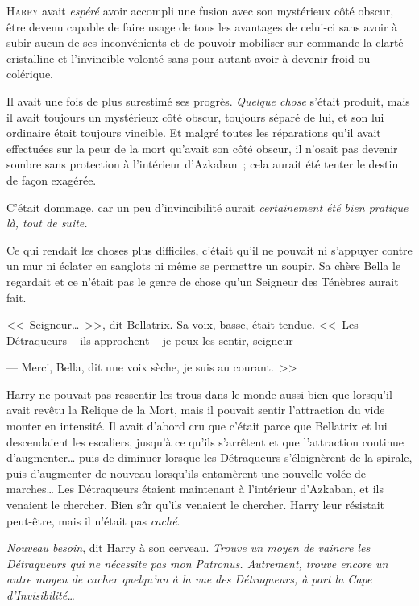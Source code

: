
\lettrine{H}{arry} avait \emph{espéré} avoir accompli une fusion avec son mystérieux côté obscur, être devenu capable de faire usage de tous les avantages de celui-ci sans avoir à subir aucun de ses inconvénients et de pouvoir mobiliser sur commande la clarté cristalline et l'invincible volonté sans pour autant avoir à devenir froid ou colérique.

Il avait une fois de plus surestimé ses progrès. \emph{Quelque chose} s'était produit, mais il avait toujours un mystérieux côté obscur, toujours séparé de lui, et son lui ordinaire était toujours vincible. Et malgré toutes les réparations qu'il avait effectuées sur la peur de la mort qu'avait son côté obscur, il n'osait pas devenir sombre sans protection à l'intérieur d'Azkaban~; cela aurait été tenter le destin de façon exagérée.

C'était dommage, car un peu d'invincibilité aurait \emph{certainement été bien pratique là, tout de suite.}

Ce qui rendait les choses plus difficiles, c'était qu'il ne pouvait ni s'appuyer contre un mur ni éclater en sanglots ni même se permettre un soupir. Sa chère Bella le regardait et ce n'était pas le genre de chose qu'un Seigneur des Ténèbres aurait fait.

<<~Seigneur…~>>, dit Bellatrix. Sa voix, basse, était tendue. <<~Les Détraqueurs -- ils approchent -- je peux les sentir, seigneur -

--- Merci, Bella, dit une voix sèche, je suis au courant.~>>

Harry ne pouvait pas ressentir les trous dans le monde aussi bien que lorsqu'il avait revêtu la Relique de la Mort, mais il pouvait sentir l'attraction du vide monter en intensité. Il avait d'abord cru que c'était parce que Bellatrix et lui descendaient les escaliers, jusqu'à ce qu'ils s'arrêtent et que l'attraction continue d'augmenter… puis de diminuer lorsque les Détraqueurs s'éloignèrent de la spirale, puis d'augmenter de nouveau lorsqu'ils entamèrent une nouvelle volée de marches… Les Détraqueurs étaient maintenant à l'intérieur d'Azkaban, et ils venaient le chercher. Bien sûr qu'ils venaient le chercher. Harry leur résistait peut-être, mais il n'était pas \emph{caché}.

\emph{Nouveau besoin}, dit Harry à son cerveau. \emph{Trouve un moyen de vaincre les Détraqueurs qui ne nécessite pas mon Patronus. Autrement, trouve encore un autre moyen de cacher quelqu'un à la vue des Détraqueurs, à part la Cape d'Invisibilité…}

